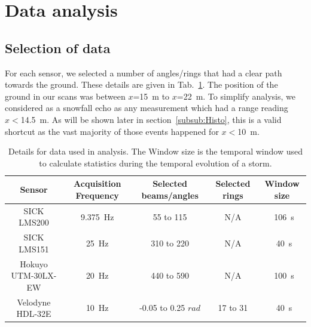 \section{Data analysis}
\label{sec:data-analysis}

\subsection{Selection of data}
For each sensor, we selected a number of angles/rings that had a clear path towards the ground. These details are given in Tab.~\ref{tab:selectionScans}. The position of the ground in our scans was between $x$=\SI{15}{\meter} to $x$=\SI{22}{\meter}. To simplify analysis, we considered as a snowfall echo as any measurement which had a range reading $x<$\SI{14.5}{\meter}. As will be shown later in section~\ref{subsub:Histo}, this is a valid shortcut as the vast majority of those events happened for $x<$\SI{10}{\meter}. 

\begin{table}[htbp]
    \centering
    \begin{tabular}{|c|c|c|c|c|}
        \hline
        \textbf{Sensor}            & \textbf{Acquisition Frequency}  & \textbf{Selected beams/angles}  & \textbf{Selected rings}  & \textbf{Window size} \\\hline
        SICK LMS200               & \SI{9.375}{\Hz}                      & 55 to 115                                    & N/A                         & ~\SI{106}{\second}       \\\hline
        SICK LMS151               & \SI{25}{\Hz}                           & 310 to 220                                  & N/A                         & ~\SI{40}{\second}        \\\hline
        Hokuyo UTM-30LX-EW  & \SI{20}{\Hz}                          & 440 to 590                                  & N/A                         & ~\SI{100}{\second}     \\\hline
        Velodyne HDL-32E        & \SI{10}{\Hz}                          & -0.05 to 0.25 $rad$                     & 17 to 31                   & ~\SI{40}{\second}      \\\hline
    \end{tabular}
    \caption{Details for data used in analysis. The Window size is the temporal window used to calculate statistics during the temporal evolution of a storm.}
    \label{tab:selectionScans}
\end{table}

